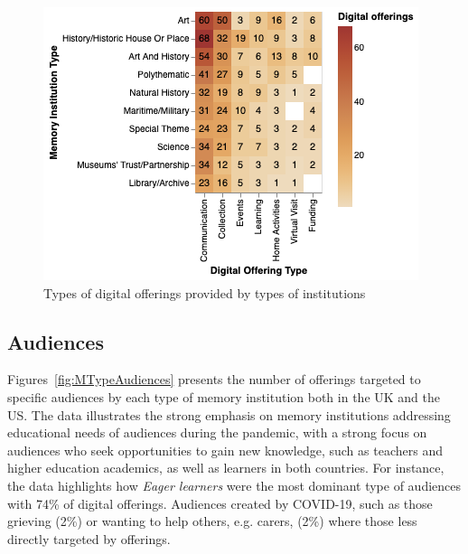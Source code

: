 \documentclass{egpubl}
\begin{document}
\begin{figure}[h]

  \centering
  \includegraphics[width=\linewidth]{images/museumoffering.png}
  \caption{\label{fig:MTypeOfferings}
           Types of digital offerings provided by types of institutions }
\end{figure}




\subsection{Audiences}

Figures~\ref{fig:MTypeAudiences} presents the number of offerings targeted to specific audiences by each type of memory institution both in the UK and the US. The data illustrates the strong emphasis on memory institutions addressing educational needs of audiences during the pandemic, with a strong focus on audiences who seek opportunities to gain new knowledge, such as teachers and higher education academics, as well as learners in both countries. For instance, the data highlights how \emph{Eager learners} were the most dominant type of audiences with 74\% of digital offerings. Audiences created by COVID-19, such as those grieving (2\%) or wanting to help others, e.g. carers, (2\%) where those less directly targeted by offerings.
\end{document}
